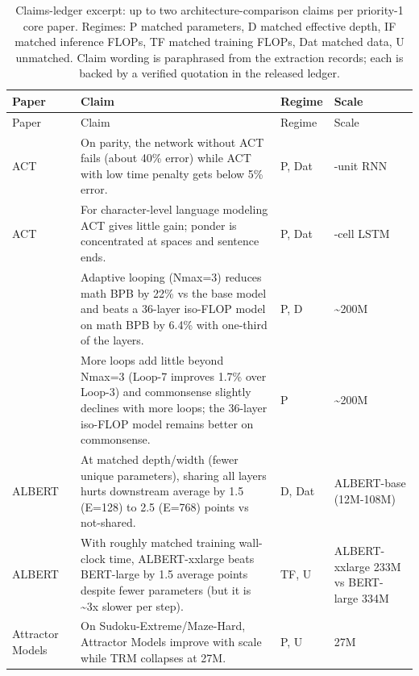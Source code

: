 \begin{longtable}{@{}>{\raggedright\arraybackslash}p{2.7cm}>{\raggedright\arraybackslash}p{7.9cm}>{\raggedright\arraybackslash}p{1.3cm}>{\raggedright\arraybackslash}p{2.5cm}@{}}
\caption{Claims-ledger excerpt: up to two architecture-comparison claims per priority-1 core paper. Regimes: P matched parameters, D matched effective depth, IF matched inference FLOPs, TF matched training FLOPs, Dat matched data, U unmatched. Claim wording is paraphrased from the extraction records; each is backed by a verified quotation in the released ledger.}\label{tab:ledger_excerpt}\\
\toprule Paper & Claim & Regime & Scale \\ \midrule \endfirsthead
\toprule Paper & Claim & Regime & Scale \\ \midrule \endhead
\bottomrule \endfoot
ACT~\citep{ax1603.08983} & On parity, the network without ACT fails (about 40\% error) while ACT with low time penalty gets below 5\% error. & P, Dat & 128-unit RNN \\
ACT~\citep{ax1603.08983} & For character-level language modeling ACT gives little gain; ponder is concentrated at spaces and sentence ends. & P, Dat & 1500-cell LSTM \\
\citep{ax2603.08391} & Adaptive looping (Nmax=3) reduces math BPB by 22\% vs the base model and beats a 36-layer iso-FLOP model on math BPB by 6.4\% with one-third of the layers. & P, D & \textasciitilde{}200M \\
\citep{ax2603.08391} & More loops add little beyond Nmax=3 (Loop-7 improves 1.7\% over Loop-3) and commonsense slightly declines with more loops; the 36-layer iso-FLOP model remains better on commonsense. & P & \textasciitilde{}200M \\
ALBERT~\citep{ax1909.11942} & At matched depth/width (fewer unique parameters), sharing all layers hurts downstream average by 1.5 (E=128) to 2.5 (E=768) points vs not-shared. & D, Dat & ALBERT-base (12M-108M) \\
ALBERT~\citep{ax1909.11942} & With roughly matched training wall-clock time, ALBERT-xxlarge beats BERT-large by 1.5 average points despite fewer parameters (but it is \textasciitilde{}3x slower per step). & TF, U & ALBERT-xxlarge 233M vs BERT-large 334M \\
Attractor Models~\citep{ax2605.12466} & On Sudoku-Extreme/Maze-Hard, Attractor Models improve with scale while TRM collapses at 27M. & P, U & 27M \\

\end{longtable}
